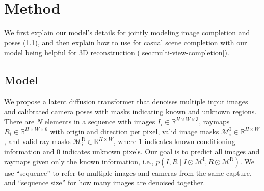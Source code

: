 \vspace{-5px}
\section{Method}
\label{sec:method}
\vspace{-5px}

We first explain our model's details for jointly modeling image completion and poses (\cref{sec:model}), and then explain how to use \method for casual scene completion with our model being helpful for 3D reconstruction (\cref{sec:multi-view-completion}).

\subsection{\method Model}\label{sec:model}

We propose a latent diffusion transformer that denoises multiple input images and calibrated camera poses with masks indicating known and unknown regions.
There are $N$ elements in a sequence with images $I_i \in \mathbb{R}^{H \times W \times 3}$, raymaps $R_i \in \mathbb{R}^{H \times W \times 6}$ with origin and direction per pixel, valid image masks $\mathcal{M}^\text{I}_i \in \mathbb{R}^{H \times W}$, and valid ray masks $\mathcal{M}^\text{R}_i \in \mathbb{R}^{H \times W}$, where 1 indicates known conditioning information and 0 indicates unknown pixels.
Our goal is to predict all images and raymaps given only the known information, i.e., $p(I,R \mid I \odot \mathcal{M}^\text{I}, R \odot \mathcal{M}^\text{R})$.
We use ``sequence'' to refer to multiple images and cameras from the same capture, and ``sequence size'' for how many images are denoised together.

